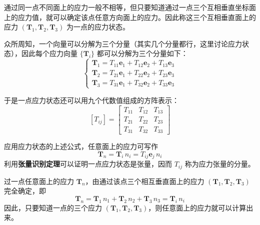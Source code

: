 \begin{definition}[一点的应力状态]
	通过同一点不同面上的应力一般不相等，但只要知道通过一点三个互相垂直坐标面上的应力值，就可以确定该点任意方向面上的应力。因此称这三个互相垂直面上的应力 $(\boldsymbol{T}_1,\boldsymbol{T}_2,\boldsymbol{T}_3)$ 为一点的应力状态。
\end{definition}

众所周知，一个向量可以分解为三个分量（其实几个分量都行，这里讨论应力状态），因此每个应力向量 $\{\boldsymbol{T}_i\}$ 都可以分解为三个分量如下：
\begin{equation}\label{eq:stress-decompose}
	\left\{\begin{array}{l}
		\boldsymbol{T}_1=T_{11}\boldsymbol{e}_1+T_{12}\boldsymbol{e}_2+T_{13}\boldsymbol{e}_3\\[2pt]
		\boldsymbol{T}_2=T_{21}\boldsymbol{e}_1+T_{22}\boldsymbol{e}_2+T_{23}\boldsymbol{e}_3\\[2pt]
		\boldsymbol{T}_3=T_{31}\boldsymbol{e}_1+T_{32}\boldsymbol{e}_2+T_{33}\boldsymbol{e}_3
	\end{array}\right.
\end{equation}

于是一点应力状态还可以用九个代数值组成的方阵表示：
\begin{equation}\label{eq:stress-tensor}
	[T_{ij}]=\begin{bmatrix}
		T_{11} & T_{12} & T_{13}\\
		T_{21} & T_{22} & T_{23}\\
		T_{31} & T_{32} & T_{33}
	\end{bmatrix}
\end{equation}

\begin{definition}[应力张量]
	应用应力状态的上述公式，任意面上的应力可写作
	\begin{equation}\label{eq:stress-tensor-action}
		\boldsymbol{T}_n=\boldsymbol{T}_i\,n_i=T_{ij}\boldsymbol{e}_j\,n_i
	\end{equation}
	利用\textbf{张量识别定理}可以证明一点应力状态是张量，因而 $T_{ij}$ 称为应力张量的分量。
\end{definition}

\begin{property}[一点应力张量的确定]
	过一点任意面上的应力 $\boldsymbol{T}_n$，由通过该点三个相互垂直面上的应力 $(\boldsymbol{T}_1,\boldsymbol{T}_2,\boldsymbol{T}_3)$ 完全确定，即
	\begin{equation}\label{eq:stress-arbitrary}
		\boldsymbol{T}_n=\boldsymbol{T}_1\,n_1+\boldsymbol{T}_2\,n_2+\boldsymbol{T}_3\,n_3=\boldsymbol{T}_i\,n_i
	\end{equation}
	因此，只要知道一点的三个应力 $(\boldsymbol{T}_1,\boldsymbol{T}_2,\boldsymbol{T}_3)$，则任意面上的应力就可以计算出来。
\end{property}

